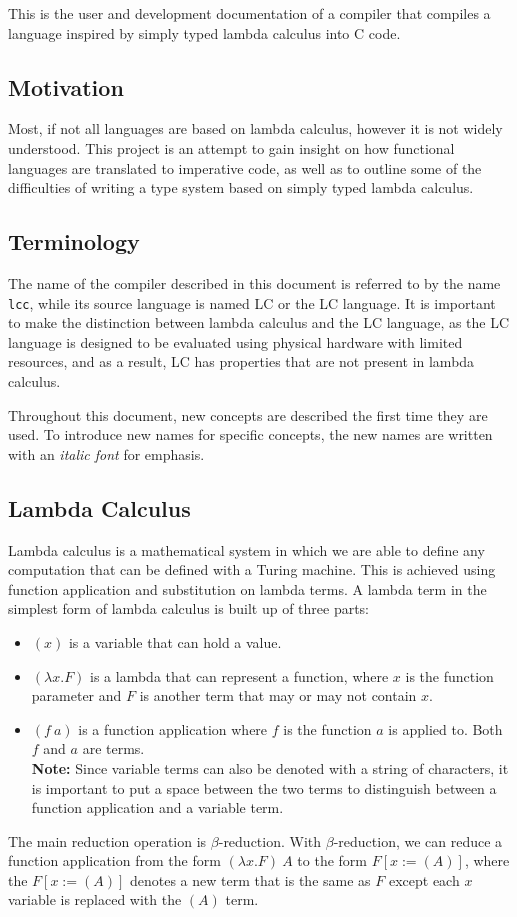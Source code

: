 \documentclass[12pt]{article}
\begin{document}
This is the user and development documentation of a compiler that compiles a
language inspired by simply typed lambda calculus into C code.

\subsection{Motivation}

Most, if not all languages are based on lambda calculus, however it is not
widely understood. This project is an attempt to gain insight on how functional
languages are translated to imperative code, as well as to outline some of the
difficulties of writing a type system based on simply typed lambda calculus.

\subsection{Terminology}

The name of the compiler described in this document is referred to by the name
\verb$lcc$, while its source language is named LC or the LC language. It is
important to make the distinction between lambda calculus and the LC language,
as the LC language is designed to be evaluated using physical hardware with
limited resources, and as a result, LC has properties that are not present in
lambda calculus.

Throughout this document, new concepts are described the first time they are
used. To introduce new names for specific concepts, the new names are written
with an \emph{italic font} for emphasis.

\subsection{Lambda Calculus}

Lambda calculus is a mathematical system in which we are able to define any
computation that can be defined with a Turing machine. This is achieved using
function application and substitution on lambda terms. A lambda term in the
simplest form of lambda calculus is built up of three parts:
\begin{itemize}
    \item $(x)$ is a variable that can hold a value.
    \item $(\lambda x. F)$ is a lambda that can represent a function, where $x$
        is the function parameter and $F$ is another term that may or 
        may not contain $x$.
    \item $(f\:a)$ is a function application where $f$ is the function $a$ is
        applied to. Both $f$ and $a$ are terms. \\ \textbf{Note:} Since variable
        terms can also be denoted with a string of characters, it is important
        to put a space between the two terms to distinguish between a function
        application and a variable term.
\end{itemize}
The main reduction operation is $\beta$-reduction. With $\beta$-reduction, we
can reduce a function application from the form $(\lambda x. F)\:A$ to the
form $F[x := (A)]$, where the $F[x := (A)]$ denotes a new term that is the same
as $F$ except each $x$ variable is replaced with the $(A)$ term.
\end{document}
